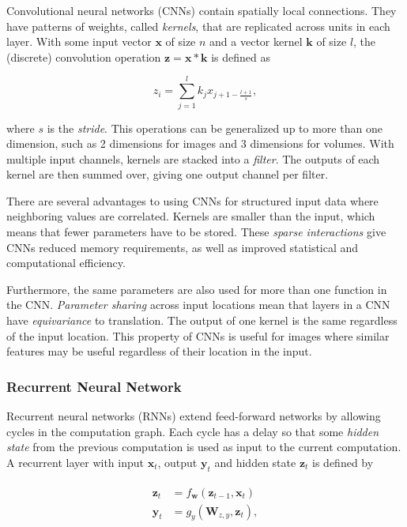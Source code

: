 Convolutional neural networks (CNNs) contain spatially local connections.
They have patterns of weights, called \textit{kernels}, that are replicated across units in each layer.
With some input vector \(\mathbf{x}\) of size \(n\) and a vector kernel \(\mathbf{k}\) of size \(l\), the (discrete) convolution operation \(\mathbf{z} = \mathbf{x} \ast \mathbf{k}\) is defined as

\begin{equation}
    z_i = \sum_{j=1}^l k_j x_{j+1-\frac{l+1}{s}},
\end{equation}

where \(s\) is the \textit{stride}.
This operations can be generalized up to more than one dimension, such as 2 dimensions for images and 3 dimensions for volumes.
With multiple input channels, kernels are stacked into a \textit{filter}.
The outputs of each kernel are then summed over, giving one output channel per filter.

There are several advantages to using CNNs for structured input data where neighboring values are correlated.
Kernels are smaller than the input, which means that fewer parameters have to be stored.
These \textit{sparse interactions} give CNNs reduced memory requirements,
as well as improved statistical and computational efficiency.

Furthermore, the same parameters are also used for more than one function in the CNN. \textit{Parameter sharing} across input locations mean that layers in a CNN have \textit{equivariance} to translation. 
The output of one kernel is the same regardless of the input location.
This property of CNNs is useful for images where similar features may be useful regardless of their location in the input.~\cite{goodfellow_deep_2016}

\subsubsection{Recurrent Neural Network}
\label{sec:rnn}

Recurrent neural networks (RNNs) extend feed-forward networks by allowing cycles in the computation graph.
Each cycle has a delay so that some \textit{hidden state} from the previous computation is used as input to the current computation.
A recurrent layer with input \(\mathbf{x}_t\), output \(\mathbf{y}_t\) and hidden state \(\mathbf{z}_t\) is defined by

\begin{align}
    \begin{split}
        \mathbf{z}_t &= f_\mathbf{w}(\mathbf{z}_{t-1}, \mathbf{x}_t) \\
        \mathbf{y}_t &= g_y(\mathbf{W}_{z,y}, \mathbf{z}_t),
    \end{split}
\end{align}

